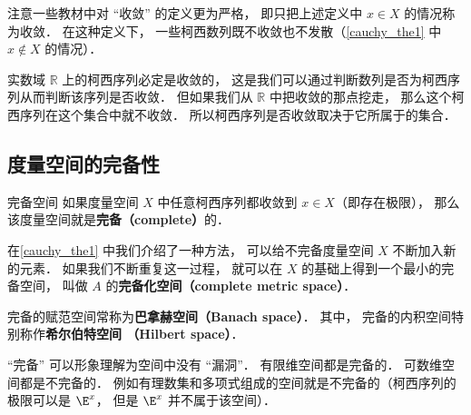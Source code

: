 注意一些教材中对 “收敛” 的定义更为严格， 即只把上述定义中 $x \in X$ 的情况称为收敛． 在这种定义下， 一些柯西数列既不收敛也不发散（\autoref{cauchy_the1} 中 $x\notin X$ 的情况）．




实数域 $\mathbb R$ 上的柯西序列必定是收敛的， 这是我们可以通过判断数列是否为柯西序列从而判断该序列是否收敛． 但如果我们从 $\mathbb R$ 中把收敛的那点挖走， 那么这个柯西序列在这个集合中就不收敛． 所以柯西序列是否收敛取决于它所属于的集合． %

\subsection{度量空间的完备性}

\begin{definition}{完备空间}
如果度量空间 $X$ 中任意柯西序列都收敛到 $x\in X$（即存在极限）， 那么该度量空间就是\textbf{完备（complete）}的．
\end{definition}

在\autoref{cauchy_the1} 中我们介绍了一种方法， 可以给不完备度量空间 $X$ 不断加入新的元素． 如果我们不断重复这一过程， 就可以在 $X$ 的基础上得到一个最小的完备空间， 叫做 $A$ 的\textbf{完备化空间（complete metric space）}．


完备的赋范空间常称为\textbf{巴拿赫空间（Banach space）}． 其中， 完备的内积空间特别称作\textbf{希尔伯特空间 （Hilbert space）}．

“完备” 可以形象理解为空间中没有 “漏洞”． 有限维空间都是完备的． 可数维空间都是不完备的． 例如有理数集和多项式组成的空间就是不完备的（柯西序列的极限可以是 $\E^x$， 但是 $\E^x$ 并不属于该空间）．
